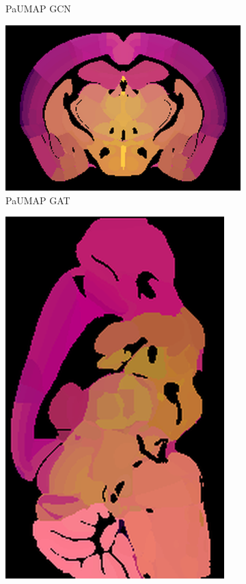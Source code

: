 \documentclass[]{article}
\begin{document}
\begin{figure}
\begin{subfigure}{.176\textwidth}
		\caption{PaUMAP GCN}
		\label{fig:ParaUMAP_GCN_sag}
	\end{subfigure}\hspace{1.3cm}
	\begin{subfigure}{.25\textwidth}
		\centering
		\includegraphics[width=.9\linewidth]{../results/para_umap_GAT_ano_coronal_50_res_slice_1.png}
		\caption{PaUMAP GAT}
		\label{fig:ParaUMAP_GAT_cor}
	\end{subfigure}
	\begin{subfigure}{.176\textwidth}
		\centering
		\includegraphics[width=.9\linewidth, angle=270]{../results/para_umap_GAT_ano_sagittal_50_res_slice_1.png}

\end{subfigure}
\end{figure}
\end{document}
